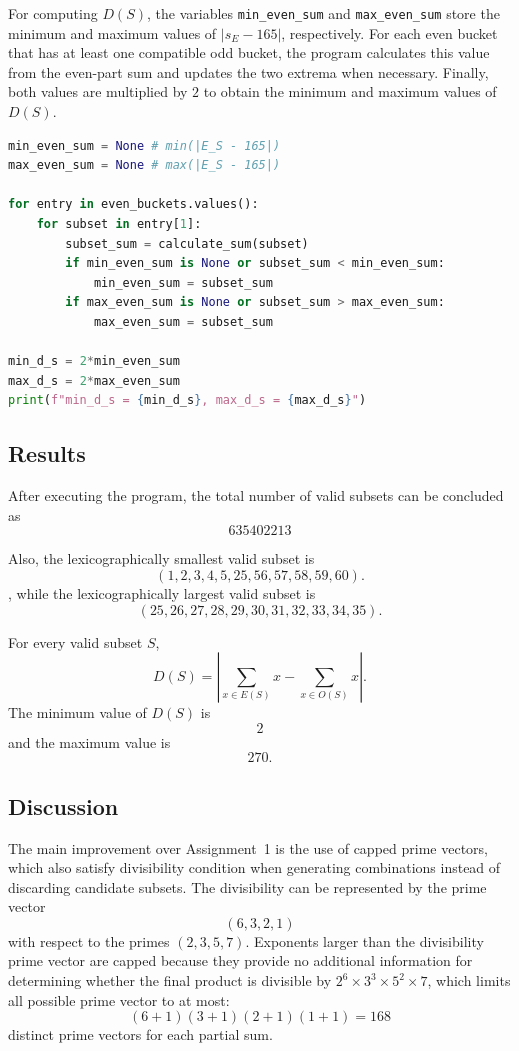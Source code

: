 \documentclass[11pt,a4paper]{article}
\begin{document}
For computing $D(S)$, the variables \texttt{min\_even\_sum} and \texttt{max\_even\_sum} store the minimum and maximum values of $|s_E-165|$, respectively. For each even bucket that has at least one compatible odd bucket, the program calculates this value from the even-part sum and updates the two extrema when necessary. Finally, both values are multiplied by $2$ to obtain the minimum and maximum values of $D(S)$.

\begin{lstlisting}[language=python]
min_even_sum = None # min(|E_S - 165|)
max_even_sum = None # max(|E_S - 165|)

for entry in even_buckets.values():
    for subset in entry[1]:
        subset_sum = calculate_sum(subset)
        if min_even_sum is None or subset_sum < min_even_sum:
            min_even_sum = subset_sum
        if max_even_sum is None or subset_sum > max_even_sum:
            max_even_sum = subset_sum

min_d_s = 2*min_even_sum
max_d_s = 2*max_even_sum
print(f"min_d_s = {min_d_s}, max_d_s = {max_d_s}")
\end{lstlisting}

\subsection*{Results}

After executing the program, the total number of valid subsets can be concluded as
\[
\boxed{635402213}
\]

Also, the lexicographically smallest valid subset is
\[
\boxed{(1, 2, 3, 4, 5, 25, 56, 57, 58, 59, 60)}.
\]
, while the lexicographically largest valid subset is
\[
\boxed{(25, 26, 27, 28, 29, 30, 31, 32, 33, 34, 35)}.
\]

For every valid subset $S$, 
\[
D(S)
=
\left|
\sum_{x\in E(S)}x
-
\sum_{x\in O(S)}x
\right|.
\]
The minimum value of $D(S)$ is
\[
\boxed{2}
\]
and the maximum value is
\[
\boxed{270}.
\]

\subsection*{Discussion}

The main improvement over Assignment~1 is the use of capped prime vectors, which also satisfy divisibility condition when generating combinations instead of discarding candidate subsets. The divisibility can be represented by the prime vector
\[
(6,3,2,1)
\]
with respect to the primes $(2,3,5,7)$. Exponents larger than the divisibility prime vector are capped because they provide no additional information for determining whether the final product is divisible by $2^6\times3^3\times5^2\times7$, which limits all possible prime vector to at most:
\[
(6+1)(3+1)(2+1)(1+1)=168
\]
distinct prime vectors for each partial sum.
\end{document}
